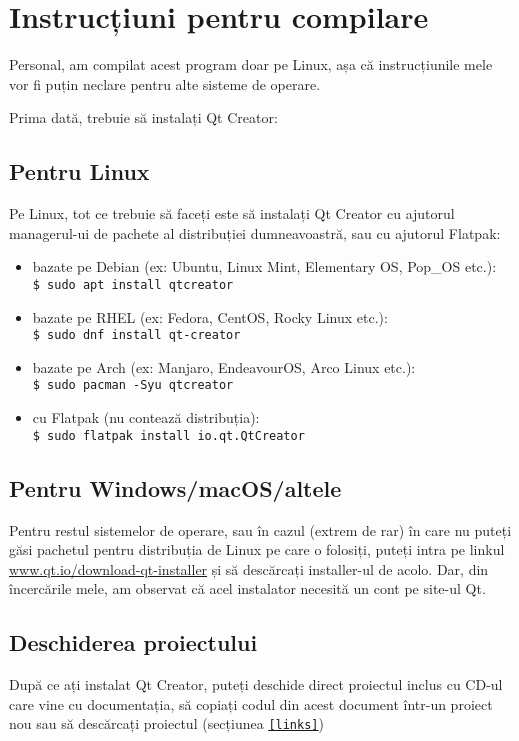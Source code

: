 \section{Instrucțiuni pentru compilare}
Personal, am compilat acest program doar pe Linux, așa că instrucțiunile mele vor fi puțin neclare pentru alte sisteme de operare.

Prima dată, trebuie să instalați Qt Creator:

\subsection{Pentru Linux}
Pe Linux, tot ce trebuie să faceți este să instalați Qt Creator cu ajutorul managerul-ui de pachete al distribuției dumneavoastră, sau cu ajutorul Flatpak:
\begin{itemize}
 \item bazate pe Debian (ex: Ubuntu, Linux Mint, Elementary OS, Pop\_OS etc.):\\
  \texttt{\$ sudo apt install qtcreator}
 \item bazate pe RHEL (ex: Fedora, CentOS, Rocky Linux etc.):\\
  \texttt{\$ sudo dnf install qt-creator}
 \item bazate pe Arch (ex: Manjaro, EndeavourOS, Arco Linux etc.):\\
  \texttt{\$ sudo pacman -Syu qtcreator}
 \item cu Flatpak (nu contează distribuția):\\
  \texttt{\$ sudo flatpak install io.qt.QtCreator}
\end{itemize}

\subsection{Pentru Windows/macOS/altele}
Pentru restul sistemelor de operare, sau în cazul (extrem de rar) în care nu puteți găsi pachetul pentru distribuția de Linux pe care o folosiți, puteți intra pe linkul \url{www.qt.io/download-qt-installer} și să descărcați installer-ul de acolo. Dar, din încercările mele, am observat că acel instalator necesită un cont pe site-ul Qt.

\subsection{Deschiderea proiectului}
După ce ați instalat Qt Creator, puteți deschide direct proiectul inclus cu CD-ul care vine cu documentația, să copiați codul din acest document într-un proiect nou sau să descărcați proiectul (secțiunea \underline{\texttt{\ref{links}}})
